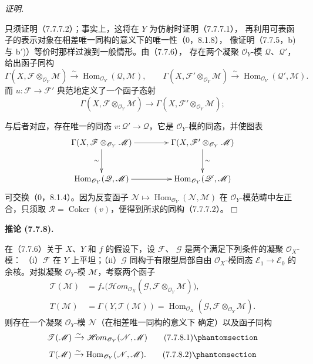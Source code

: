 \documentclass[UTF8,fontset=none,11pt,oneside,openany]{ctexbook}
\providecommand{\square}{\mdlgwhtsquare}
\newenvironment{corollary}[1][]{%
  \par\medskip\noindent\textbf{推论 (#1).}\ %
}{\par}
\newenvironment{proof}{%
  \par\smallskip\noindent\textit{证明.}\ %
}{\hfill$\square$\par}
\newcommand{\oldpage}[2][]{%
  \hypertarget{ega-source-page-#1-#2}{}%
  \marginnote{\scriptsize\textbf{#1}~|~#2}\ignorespaces}
\let\EGAOriginalLabel\label
\renewcommand{\label}[1]{\phantomsection\EGAOriginalLabel{#1}}
\begin{document}
\begin{proof}
只须证明（7.7.7.2）；事实上，这将在 $Y$ 为仿射时证明（7.7.7.1），
再利用可表函子的表示对象在相差唯一同构的意义下的唯一性（0，8.1.8），
像证明（7.7.5，b) 与 b$'$)）等价时那样过渡到一般情形。由（7.7.6），
存在两个凝聚 $\mathscr O_Y$-模 $\mathscr Q$、$\mathscr Q'$，给出函子同构
\[
  \Gamma(X,\mathscr F\otimes_{\mathscr O_Y}\mathscr M)
  \xrightarrow{\sim}
  \operatorname{Hom}_{\mathscr O_Y}(\mathscr Q,\mathscr M),
  \qquad
  \Gamma(X,\mathscr F'\otimes_{\mathscr O_Y}\mathscr M)
  \xrightarrow{\sim}
  \operatorname{Hom}_{\mathscr O_Y}(\mathscr Q',\mathscr M).
\]
而 $u:\mathscr F\to\mathscr F'$ 典范地定义了一个函子态射
\[
  \Gamma(X,\mathscr F\otimes_{\mathscr O_Y}\mathscr M)
  \longrightarrow
  \Gamma(X,\mathscr F'\otimes_{\mathscr O_Y}\mathscr M);
\]

\oldpage[III]{202}
与后者对应，存在唯一的同态 $v:\mathscr Q'\to\mathscr Q$，它是
$\mathscr O_Y$-模的同态，并使图表
\[
\xymatrix@C=42pt@R=28pt{
  \Gamma(X,\mathscr F\otimes_{\mathscr O_Y}\mathscr M)
    \ar[r]\ar[d]_-{\sim}
  &
  \Gamma(X,\mathscr F'\otimes_{\mathscr O_Y}\mathscr M)
    \ar[d]^-{\sim}
  \\
  \operatorname{Hom}_{\mathscr O_Y}(\mathscr Q,\mathscr M)
    \ar[r]
  &
  \operatorname{Hom}_{\mathscr O_Y}(\mathscr Q',\mathscr M)
}
\]
可交换（0，8.1.4）。因为反变函子
$\mathscr N\mapsto\operatorname{Hom}_{\mathscr O_Y}(\mathscr N,\mathscr M)$
在 $\mathscr O_Y$-模范畴中左正合，只须取
$\mathscr R=\operatorname{Coker}(v)$，便得到所求的同构（7.7.7.2）。
\end{proof}

\begin{corollary}[7.7.8]
在（7.7.6）关于 $X$、$Y$ 和 $f$ 的假设下，设 $\mathscr F$、
$\mathscr G$ 是两个满足下列条件的凝聚 $\mathscr O_X$-模：
（i）$\mathscr F$ 在 $Y$ 上平坦；（ii）$\mathscr G$ 同构于有限型局部自由
$\mathscr O_X$-模同态 $\mathscr E_1\to\mathscr E_0$ 的余核。对拟凝聚
$\mathscr O_Y$-模 $\mathscr M$，考察两个函子
\begin{align*}
  \mathscr T(\mathscr M)
  &=
  f_*
  \bigl(
    \mathscr{H}\!om_{\mathscr O_X}
      (\mathscr G,\mathscr F\otimes_{\mathscr O_Y}\mathscr M)
  \bigr),\\
  T(\mathscr M)
  &=
  \Gamma(Y,\mathscr T(\mathscr M))
  =
  \operatorname{Hom}_{\mathscr O_X}
    (\mathscr G,\mathscr F\otimes_{\mathscr O_Y}\mathscr M).
\end{align*}
则存在一个凝聚 $\mathscr O_Y$-模 $\mathscr N$（在相差唯一同构的意义下
确定）以及函子同构
\[
  \mathscr T(\mathscr M)
  \xrightarrow{\sim}
  \mathscr{H}\!om_{\mathscr O_Y}(\mathscr N,\mathscr M)
  \tag{7.7.8.1}\label{III.7.7.8.1.fr}
\]
\[
  T(\mathscr M)
  \xrightarrow{\sim}
  \operatorname{Hom}_{\mathscr O_Y}(\mathscr N,\mathscr M).
  \tag{7.7.8.2}\label{III.7.7.8.2.fr}
\]
\end{corollary}
\end{document}
